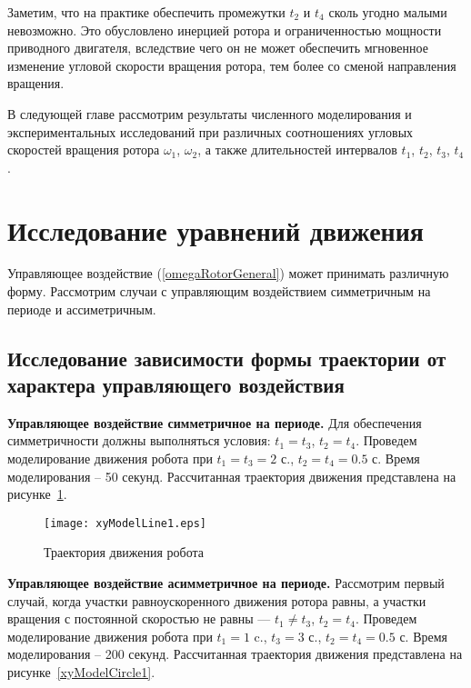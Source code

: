 Заметим, что на практике обеспечить промежутки $t_2$ и $t_4$ сколь угодно малыми невозможно. Это обусловлено инерцией ротора и ограниченностью мощности приводного двигателя, вследствие чего он не может обеспечить мгновенное изменение угловой скорости вращения ротора, тем более со сменой направления вращения.

В следующей главе рассмотрим результаты численного моделирования и экспериментальных исследований при различных соотношениях угловых скоростей вращения ротора $\omega_1$, $\omega_2$, а также длительностей интервалов $t_1$, $t_2$, $t_3$, $t_4$.


\section{Исследование уравнений движения}

Управляющее воздействие (\ref{omegaRotorGeneral}) может принимать различную форму. Рассмотрим случаи с управляющим воздействием симметричным на периоде и ассиметричным. %


\subsection{Исследование зависимости формы траектории от характера управляющего воздействия}



\textbf{Управляющее воздействие симметричное на периоде.} Для обеспечения симметричности должны выполняться условия: $t_1=t_3$, $t_2=t_4$. Проведем моделирование движения робота при $t_1=t_3=2$ с., $t_2=t_4 = 0.5$ с. Время моделирования -- 50 секунд. Рассчитанная траектория движения представлена на рисунке~\ref{xyModelLine1}.

\begin{figure}[!ht]
	\centering
	\texttt{[image: xyModelLine1.eps]}
	\caption{Траектория движения робота}
	\label{xyModelLine1}
\end{figure}

\textbf{Управляющее воздействие асимметричное на периоде.} Рассмотрим первый случай, когда участки равноускоренного движения ротора равны, а участки вращения с постоянной скоростью не равны --- $t_1 \neq t_3$, $t_2=t_4$. Проведем моделирование движения робота при $t_1=1$ c., $t_3=3$ с., $t_2=t_4 = 0.5$ с. Время моделирования -- 200 секунд. Рассчитанная траектория движения представлена на рисунке~\ref{xyModelCircle1}.

